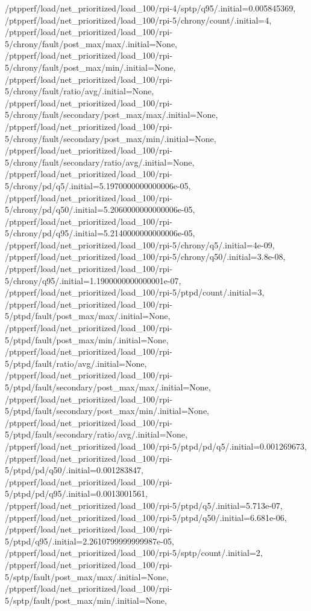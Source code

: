 {    /ptpperf/load/net_prioritized/load_100/rpi-4/sptp/q95/.initial=0.005845369,
    /ptpperf/load/net_prioritized/load_100/rpi-5/chrony/count/.initial=4,
    /ptpperf/load/net_prioritized/load_100/rpi-5/chrony/fault/post_max/max/.initial=None,
    /ptpperf/load/net_prioritized/load_100/rpi-5/chrony/fault/post_max/min/.initial=None,
    /ptpperf/load/net_prioritized/load_100/rpi-5/chrony/fault/ratio/avg/.initial=None,
    /ptpperf/load/net_prioritized/load_100/rpi-5/chrony/fault/secondary/post_max/max/.initial=None,
    /ptpperf/load/net_prioritized/load_100/rpi-5/chrony/fault/secondary/post_max/min/.initial=None,
    /ptpperf/load/net_prioritized/load_100/rpi-5/chrony/fault/secondary/ratio/avg/.initial=None,
    /ptpperf/load/net_prioritized/load_100/rpi-5/chrony/pd/q5/.initial=5.1970000000000006e-05,
    /ptpperf/load/net_prioritized/load_100/rpi-5/chrony/pd/q50/.initial=5.2060000000000006e-05,
    /ptpperf/load/net_prioritized/load_100/rpi-5/chrony/pd/q95/.initial=5.2140000000000006e-05,
    /ptpperf/load/net_prioritized/load_100/rpi-5/chrony/q5/.initial=4e-09,
    /ptpperf/load/net_prioritized/load_100/rpi-5/chrony/q50/.initial=3.8e-08,
    /ptpperf/load/net_prioritized/load_100/rpi-5/chrony/q95/.initial=1.1900000000000001e-07,
    /ptpperf/load/net_prioritized/load_100/rpi-5/ptpd/count/.initial=3,
    /ptpperf/load/net_prioritized/load_100/rpi-5/ptpd/fault/post_max/max/.initial=None,
    /ptpperf/load/net_prioritized/load_100/rpi-5/ptpd/fault/post_max/min/.initial=None,
    /ptpperf/load/net_prioritized/load_100/rpi-5/ptpd/fault/ratio/avg/.initial=None,
    /ptpperf/load/net_prioritized/load_100/rpi-5/ptpd/fault/secondary/post_max/max/.initial=None,
    /ptpperf/load/net_prioritized/load_100/rpi-5/ptpd/fault/secondary/post_max/min/.initial=None,
    /ptpperf/load/net_prioritized/load_100/rpi-5/ptpd/fault/secondary/ratio/avg/.initial=None,
    /ptpperf/load/net_prioritized/load_100/rpi-5/ptpd/pd/q5/.initial=0.001269673,
    /ptpperf/load/net_prioritized/load_100/rpi-5/ptpd/pd/q50/.initial=0.001283847,
    /ptpperf/load/net_prioritized/load_100/rpi-5/ptpd/pd/q95/.initial=0.0013001561,
    /ptpperf/load/net_prioritized/load_100/rpi-5/ptpd/q5/.initial=5.713e-07,
    /ptpperf/load/net_prioritized/load_100/rpi-5/ptpd/q50/.initial=6.681e-06,
    /ptpperf/load/net_prioritized/load_100/rpi-5/ptpd/q95/.initial=2.2610799999999987e-05,
    /ptpperf/load/net_prioritized/load_100/rpi-5/sptp/count/.initial=2,
    /ptpperf/load/net_prioritized/load_100/rpi-5/sptp/fault/post_max/max/.initial=None,
    /ptpperf/load/net_prioritized/load_100/rpi-5/sptp/fault/post_max/min/.initial=None,
}
